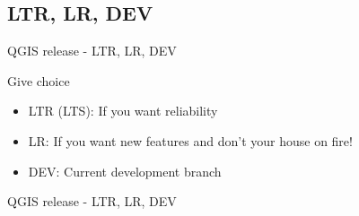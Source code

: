 \subsection{LTR, LR, DEV}
\begin{frame}{QGIS release - LTR, LR, DEV}
	\begin{block}{Give choice}
		\begin{itemize}
			\item LTR (LTS): If you want reliability
			\item LR: If you want new features and don't your house on fire!
			\item DEV: Current development branch
		\end{itemize}
	\end{block}
\end{frame}

\begin{frame}{QGIS release - LTR, LR, DEV}
\end{frame}

